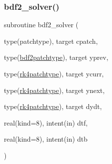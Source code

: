\subsubsection{\texorpdfstring{bdf2\+\_\+solver()}{bdf2\_solver()}}
{\footnotesize\ttfamily subroutine bdf2\+\_\+solver (\begin{DoxyParamCaption}\item[{type(patchtype), target}]{cpatch,  }\item[{type(\hyperlink{structrk4__coms_1_1bdf2patchtype}{bdf2patchtype}), target}]{yprev,  }\item[{type(\hyperlink{structrk4__coms_1_1rk4patchtype}{rk4patchtype}), target}]{ycurr,  }\item[{type(\hyperlink{structrk4__coms_1_1rk4patchtype}{rk4patchtype}), target}]{ynext,  }\item[{type(\hyperlink{structrk4__coms_1_1rk4patchtype}{rk4patchtype}), target}]{dydt,  }\item[{real(kind=8), intent(in)}]{dtf,  }\item[{real(kind=8), intent(in)}]{dtb }\end{DoxyParamCaption})}

